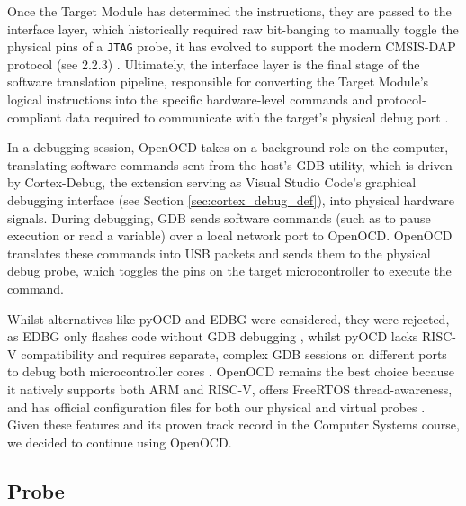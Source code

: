 Once the Target Module has determined the instructions, they are passed to the interface layer, which historically required raw bit-banging to manually toggle the physical pins of a \texttt{JTAG} probe, it has evolved to support the modern CMSIS-DAP protocol (see 2.2.3) \cite{cmsis_dap, openocd_website,hoegl2006openocd}. Ultimately, the interface layer is the final stage of the software translation pipeline, responsible for converting the Target Module's logical instructions into the specific hardware-level commands and protocol-compliant data required to communicate with the target's physical debug port \cite{hoegl2006openocd}.

In a debugging session, OpenOCD takes on a background role on the computer, translating software commands sent from the host's GDB utility, which is driven by Cortex-Debug, the extension serving as Visual Studio Code's graphical debugging interface (see Section \ref{sec:cortex_debug_def}), into physical hardware signals. During debugging, GDB sends software commands (such as to pause execution or read a variable) over a local network port to OpenOCD. OpenOCD translates these commands into USB packets and sends them to the physical debug probe, which toggles the pins on the target microcontroller to execute the command.

Whilst alternatives like pyOCD and EDBG were considered, they were rejected, as EDBG only flashes code without GDB debugging \cite{edbg_github}, whilst pyOCD lacks RISC-V compatibility and requires separate, complex GDB sessions on different ports to debug both microcontroller cores \cite{pyocd_debug_probes, pyocd_gdb_server}. OpenOCD remains the best choice because it natively supports both ARM and RISC-V, offers FreeRTOS thread-awareness, and has official configuration files for both our physical and virtual probes \cite{gdb_architecture, pico_getting_started}. Given these features and its proven track record in the Computer Systems course, we decided to continue using OpenOCD.


\subsection{Probe}

